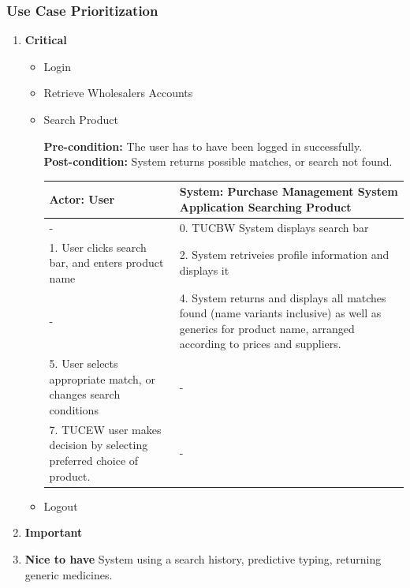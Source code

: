 \documentclass[a4paper,10pt]{article}
\begin{document}
	\subsubsection{Use Case Prioritization} 
		\begin{enumerate} 
		\item \textbf{Critical} 
			\begin{itemize} 
				\item Login
				\item Retrieve Wholesalers Accounts 
				\item Search Product 
				
				\textbf{Pre-condition: } The user has to have been logged in successfully.  \\
				\textbf{Post-condition: }  System returns possible matches, or search not found. \\
				\begin{center}
				\begin{tabular}{ |p{8cm}|p{8cm}| }
				 \hline
  				\textbf{Actor:} User & \textbf{System: Purchase Management System Application} Searching Product \\
				 \hline
				 - & 0. TUCBW System displays search bar\\
				 \hline
				  1. User clicks search bar, and enters product name & 2. System retriveies profile information and displays it\\
				 \hline
				 - & 4. System returns and displays all matches found (name variants inclusive) as well as  generics for product name, arranged according to prices and suppliers. \\
				 \hline
				5. User selects appropriate match, or changes search conditions & - \\
				 \hline
				7. TUCEW user makes decision by selecting preferred choice of product. & - \\
				\hline
				
				\end{tabular}
				\end{center}
				
				\item Logout
			\end{itemize} 
		\item \textbf{Important} 

		\item \textbf{Nice to have}
		System using a search history, predictive typing, returning generic medicines. \\\\
		\end{enumerate} 
\end{document}
